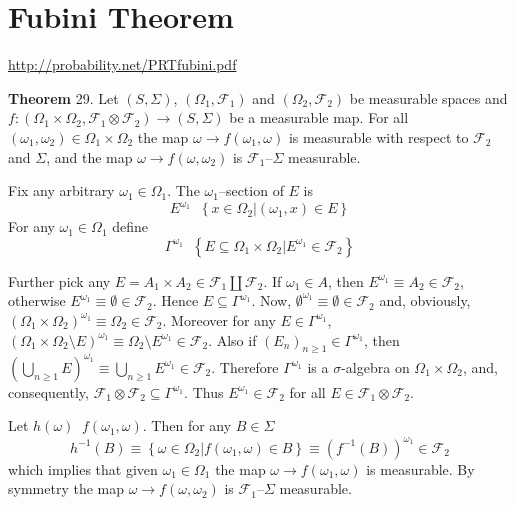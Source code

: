 \documentclass[a4paper]{article}
\newcommand{\obj}[1]{\left\{ #1 \right \}}
\newcommand{\brac}[1]{\left ( #1 \right )}
\newcommand{\induc}[1]{\left . #1 \right \vert}
\newcommand{\Fcal}{\mathcal{F}}
\newcommand{\defn}{\mathop{\overset{\Delta}{=}}\nolimits}
\begin{document}

\section{Fubini Theorem} %
\label{sec:tut_7}
\url{http://probability.net/PRTfubini.pdf}

\label{thm:fun_section} \noindent \textbf{Theorem} 29.
Let $\brac{S,\Sigma}$, $\brac{\Omega_1, \Fcal_1}$ and $\brac{\Omega_2, \Fcal_2}$ be measurable spaces and $f:\brac{\Omega_1\times \Omega_2, \Fcal_1 \otimes \Fcal_2 }\to \brac{ S, \Sigma }$ be a measurable map. For all $\brac{\omega_1, \omega_2} \in \Omega_1\times \Omega_2$ the map $\omega\to f\brac{\omega_1, \omega}$ is measurable with respect to $\Fcal_2$ and $\Sigma$, and the map $\omega\to f\brac{\omega, \omega_2}$ is $\Fcal_1$--$\Sigma$ measurable.

Fix any arbitrary $\omega_1\in \Omega_1$. The $\omega_1$--section of $E$ is \[E^{\omega_1} \defn \obj{ \induc{ x\in \Omega_2 } \brac{ \omega_1, x } \in E }\] For any $\omega_1\in \Omega_1$ define \[\Gamma^{\omega_1} \defn \obj{ \induc{ E\subseteq \Omega_1\times \Omega_2 } E^{\omega_1}\in \Fcal_2 }\]

Further pick any $E = A_1\times A_2 \in \Fcal_1 \coprod \Fcal_2$. If $\omega_1\in A$, then $E^{\omega_1} \equiv A_2\in \Fcal_2$, otherwise $E^{\omega_1} \equiv \emptyset\in \Fcal_2$. Hence $E\subseteq \Gamma^{\omega_1}$. Now, $\emptyset^{\omega_1} \equiv \emptyset\in \Fcal_2$ and, obviously, $\brac{\Omega_1\times \Omega_2}^{\omega_1} \equiv \Omega_2\in \Fcal_2$. Moreover for any $E\in \Gamma^{\omega_1}$, $\brac{\Omega_1\times \Omega_2\setminus E}^{\omega_1} \equiv \Omega_2\setminus E^{\omega_1} \in \Fcal_2$. Also if $\brac{E_n}_{n\geq 1}\in \Gamma^{\omega_1}$, then $\brac{ \bigcup_{n\geq 1} E }^{\omega_1} \equiv \bigcup_{n\geq 1} E^{\omega_1} \in \Fcal_2$. Therefore $\Gamma^{\omega_1}$ is a $\sigma$-algebra on $\Omega_1\times \Omega_2$, and, consequently, $\Fcal_1 \otimes \Fcal_2\subseteq \Gamma^{\omega_1}$. Thus $E^{\omega_1}\in \Fcal_2$ for all $E\in \Fcal_1 \otimes \Fcal_2$.

Let $h\brac{\omega}\defn f\brac{\omega_1, \omega}$. Then for any $B\in \Sigma$ \[h^{-1}\brac{ B } \equiv \obj{ \induc{ \omega\in \Omega_2 } f\brac{\omega_1, \omega} \in B } \equiv \brac{f^{-1}\brac{B}}^{\omega_1} \in \Fcal_2\] which implies that given $\omega_1\in \Omega_1$ the map $\omega\to f\brac{\omega_1, \omega}$ is measurable. By symmetry the map $\omega\to f\brac{\omega, \omega_2}$ is $\Fcal_1$--$\Sigma$ measurable.
\end{document}
